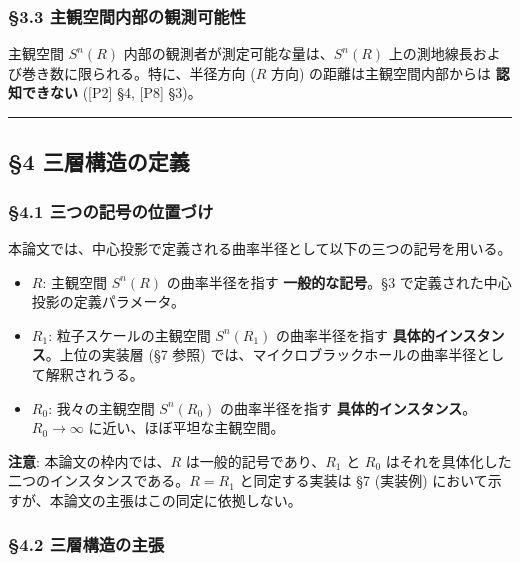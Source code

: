 \documentclass[
  a4paper,11pt]{ltjsarticle}
\providecommand{\tightlist}{%
  \setlength{\itemsep}{0pt}\setlength{\parskip}{0pt}}
\begin{document}
\subsubsection{§3.3
主観空間内部の観測可能性}\label{ux4e3bux89b3ux7a7aux9593ux5185ux90e8ux306eux89b3ux6e2cux53efux80fdux6027}

主観空間 \(S^n(R)\) 内部の観測者が測定可能な量は、\(S^n(R)\)
上の測地線長および巻き数に限られる。特に、半径方向 (\(R\) 方向)
の距離は主観空間内部からは \textbf{認知できない} ({[}P2{]} §4, {[}P8{]}
§3)。

\begin{center}\rule{0.5\linewidth}{0.5pt}\end{center}

\subsection{§4
三層構造の定義}\label{ux4e09ux5c64ux69cbux9020ux306eux5b9aux7fa9}

\subsubsection{§4.1
三つの記号の位置づけ}\label{ux4e09ux3064ux306eux8a18ux53f7ux306eux4f4dux7f6eux3065ux3051}

本論文では、中心投影で定義される曲率半径として以下の三つの記号を用いる。

\begin{itemize}
\tightlist
\item
  \(R\): 主観空間 \(S^n(R)\) の曲率半径を指す \textbf{一般的な記号}。§3
  で定義された中心投影の定義パラメータ。
\item
  \(R_1\): 粒子スケールの主観空間 \(S^n(R_1)\) の曲率半径を指す
  \textbf{具体的インスタンス}。上位の実装層 (§7 参照)
  では、マイクロブラックホールの曲率半径として解釈されうる。
\item
  \(R_0\): 我々の主観空間 \(S^n(R_0)\) の曲率半径を指す
  \textbf{具体的インスタンス}。\(R_0 \to \infty\)
  に近い、ほぼ平坦な主観空間。
\end{itemize}

\textbf{注意}: 本論文の枠内では、\(R\) は一般的記号であり、\(R_1\) と
\(R_0\) はそれを具体化した二つのインスタンスである。\(R = R_1\)
と同定する実装は §7 (実装例)
において示すが、本論文の主張はこの同定に依拠しない。

\subsubsection{§4.2
三層構造の主張}\label{ux4e09ux5c64ux69cbux9020ux306eux4e3bux5f35}
\end{document}
